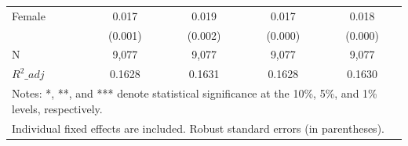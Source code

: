 \begin{table}[htbp]
\begin{tabular}{l*{4}{c}}
\addlinespace
Female              &       0.017\sym{***}&       0.019\sym{***}&       0.017\sym{***}&       0.018\sym{***}\\
                    &     (0.001)         &     (0.002)         &     (0.000)         &     (0.000)         \\
\midrule
N                   &       9,077         &       9,077         &       9,077         &       9,077         \\
\(R^2\_{adj}\)       &      0.1628         &      0.1631         &      0.1628         &      0.1630         \\
\bottomrule
\multicolumn{5}{l}{\footnotesize Notes: *, **, and *** denote statistical significance at the 10\%, 5\%, and 1\% levels, respectively.}\\
\multicolumn{5}{l}{\footnotesize Individual fixed effects are included. Robust standard errors (in parentheses).}\\
\end{tabular}
\end{table}
